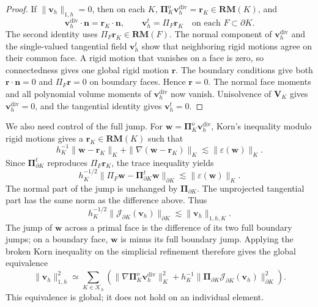 \documentclass[review,hidelinks,onefignum,onetabnum]{siamart251216}
\begin{document}
\begin{proof}
If $\|\boldsymbol v_h\|_{1,h}=0$, then on each $K$,
$\boldsymbol\Pi_K^o\boldsymbol v_h^{\operatorname{div}}=\boldsymbol r_K
\in\mathbf{RM}(K)$, and
\[
\boldsymbol v_h^{\operatorname{div}}\cdot\boldsymbol n
=\boldsymbol r_K\cdot\boldsymbol n,
\qquad
\boldsymbol v_h^t=\Pi_F\boldsymbol r_K\quad\text{on each }F\subset\partial K.
\]
The second identity uses $\Pi_F\boldsymbol r_K\in\mathbf{RM}(F)$.
The normal component of $\boldsymbol v_h^{\operatorname{div}}$ and the
single-valued tangential field $\boldsymbol v_h^t$ show that neighboring
rigid motions agree on their common face. A rigid motion that vanishes on
a face is zero, so connectedness gives one global rigid motion $\boldsymbol r$.
The boundary conditions give both $\boldsymbol r\cdot\boldsymbol n=0$ and
$\Pi_F\boldsymbol r=0$ on boundary faces. Hence $\boldsymbol r=0$.
The normal face moments and all polynomial volume moments of
$\boldsymbol v_h^{\operatorname{div}}$ now vanish. Unisolvence of
$\boldsymbol V_K$ gives $\boldsymbol v_h^{\operatorname{div}}=0$,
and the tangential identity gives $\boldsymbol v_h^t=0$.
\end{proof}

We also need control of the full jump. For
$\boldsymbol w=\boldsymbol\Pi_K^o\boldsymbol v_h^{\operatorname{div}}$,
Korn's inequality modulo rigid motions gives a $\boldsymbol r_K\in\mathbf{RM}(K)$
such that
\[
h_K^{-1}\|\boldsymbol w-\boldsymbol r_K\|_K
+\|\nabla(\boldsymbol w-\boldsymbol r_K)\|_K
\lesssim\|\varepsilon(\boldsymbol w)\|_K.
\]
Since $\boldsymbol\Pi_{\partial K}^t$ reproduces $\Pi_F\boldsymbol r_K$,
the trace inequality yields
\[
h_K^{-1/2}\|\Pi_F\boldsymbol w-
\boldsymbol\Pi_{\partial K}^t\boldsymbol w\|_{\partial K}
\lesssim\|\varepsilon(\boldsymbol w)\|_K.
\]
The normal part of the jump is unchanged by $\boldsymbol\Pi_{\partial K}$.
The unprojected tangential part has the same norm as the difference above. Thus
\begin{equation}\label{eq:fulljump}
h_K^{-1/2}\|\mathcal J_{\partial K}(\boldsymbol v_h)\|_{\partial K}
\lesssim\|\boldsymbol v_h\|_{1,h,K}.
\end{equation}
The jump of $\boldsymbol w$ across a primal face is the difference of its
two full boundary jumps; on a boundary face, $\boldsymbol w$ is minus its
full boundary jump. Applying the broken Korn inequality \cite{Brenner2004}
on the simplicial refinement therefore gives the global equivalence
\begin{equation}\label{eq:globalKorn}
\|\boldsymbol v_h\|_{1,h}^2\simeq
\sum_{K\in\mathcal K_h}\left(
\|\nabla\boldsymbol\Pi_K^o\boldsymbol v_h^{\operatorname{div}}\|_K^2
+h_K^{-1}\|\boldsymbol\Pi_{\partial K}\mathcal J_{\partial K}(\boldsymbol v_h)\|_{\partial K}^2
\right).
\end{equation}
This equivalence is global; it does not hold on an individual element.
\end{document}
